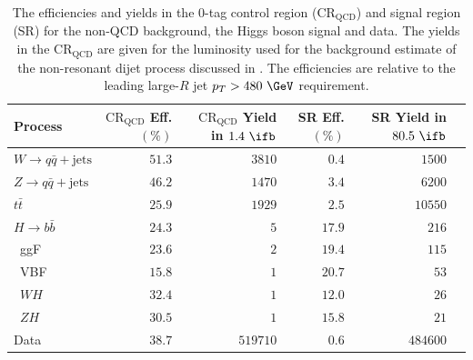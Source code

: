 \begin{table}[htpb]
 \centering
 \caption{The efficiencies and yields in the $0$-tag control region ($\text{CR}_{\text{QCD}}$) and signal region (SR) for the non-QCD background, the Higgs boson signal and data. The yields in the $\text{CR}_{\text{QCD}}$ are given for the luminosity used for the background estimate of the non-resonant dijet process discussed in . The efficiencies are relative to the leading large-$R$ jet $p_{T} > 480~\GeV$ requirement.}
 \begin{adjustbox}{max width=\textwidth}
  \begin{tabular}{@{}lrrrrr@{}}
   \toprule
   Process                             & $\text{CR}_{\text{QCD}}$ Eff. $(\%)$ & $\text{CR}_{\text{QCD}}$ Yield in $1.4~\ifb$ & SR Eff. $(\%)$ & SR Yield in $80.5~\ifb$ \\ \midrule
   $W \to q\bar{q} + \text{jets}$    & $51.3$               & $3810$                       & $0.4$          & $1500$                  \\
   $Z \to q\bar{q} + \text{jets}$    & $46.2$               & $1470$                       & $3.4$          & $6200$                  \\
   $t\bar{t}$                          & $25.9$               & $1929$                       & $2.5$          & $10550$                 \\
   $H \rightarrow b\bar{b}$                              & $24.3$               & $5$                          & $17.9$         & $216$                   \\
   \phantom{$H \rightarrow b\bar{b}$\quad}~ggF           & $23.6$               & $2$                          & $19.4$         & $115$                   \\
   \phantom{$H \rightarrow b\bar{b}$\quad}~VBF           & $15.8$               & $1$                          & $20.7$         & $53$                    \\
   \phantom{$H \rightarrow b\bar{b}$\quad}~$WH$          & $32.4$               & $1$                          & $12.0$         & $26$                    \\
   \phantom{$H \rightarrow b\bar{b}$\quad}~$ZH$          & $30.5$               & $1$                          & $15.8$         & $21$                    \\
   Data                                & $38.7$               & $519710$                     & $0.6$          & $484600$                \\
   \bottomrule
  \end{tabular}
 \end{adjustbox}
 \label{table:efficiencies_and_yields}
\end{table}


